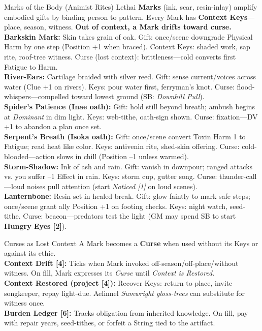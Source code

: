 \documentclass[11pt]{book}
\begin{document}
\begin{atTheTable}{Marks of the Body (Animist Rites)}
Lethai \textbf{Marks} (ink, scar, resin-inlay) amplify embodied gifts by binding person to pattern. Every Mark has \textbf{Context Keys}---place, season, witness. \textbf{Out of context, a Mark drifts toward curse.} \\
\textbf{Barkskin Mark:} Skin takes grain of oak. Gift: once/scene downgrade Physical Harm by one step (Position +1 when braced). Context Keys: shaded work, sap rite, roof-tree witness. Curse (lost context): brittleness---cold converts first Fatigue to Harm. \\
\textbf{River-Ears:} Cartilage braided with silver reed. Gift: sense current/voices across water (Clue +1 on rivers). Keys: pour water first, ferryman's knot. Curse: flood-whispers---compelled toward lowest ground (SB: \emph{Downhill Pull}). \\
\textbf{Spider's Patience (Inae oath):} Gift: hold still beyond breath; ambush begins at \emph{Dominant} in dim light. Keys: web-tithe, oath-sign shown. Curse: fixation---DV +1 to abandon a plan once set. \\
\textbf{Serpent's Breath (Isoka oath):} Gift: once/scene convert Toxin Harm 1 to Fatigue; read heat like color. Keys: antivenin rite, shed-skin offering. Curse: cold-blooded---action slows in chill (Position --1 unless warmed). \\
\textbf{Storm-Shadow:} Ink of ash and rain. Gift: vanish in downpour; ranged attacks vs. you suffer --1 Effect in rain. Keys: storm cup, gutter song. Curse: thunder-call---loud noises pull attention (start \emph{Noticed [1]} on loud scenes). \\
\textbf{Lanternbone:} Resin set in healed break. Gift: glow faintly to mark safe steps; once/scene grant ally Position +1 on footing checks. Keys: night watch, seed-tithe. Curse: beacon---predators test the light (GM may spend SB to start \textbf{Hungry Eyes [2]}).
\end{atTheTable}
\begin{atTheTable}{Curses as Lost Context}
A Mark becomes a \textbf{Curse} when used without its Keys or against its ethic. \\
\textbf{Context Drift [4]:} Ticks when Mark invoked off-season/off-place/without witness. On fill, Mark expresses its \textit{Curse} until \textit{Context is Restored}. \\
\textbf{Context Restored (project [4]):} Recover Keys: return to place, invite songkeeper, repay light-due. Aelinnel \textit{Sumwright gloss-trees} can substitute for witness once. \\
\textbf{Burden Ledger [6]:} Tracks obligation from inherited knowledge. On fill, pay with repair years, seed-tithes, or forfeit a String tied to the artifact.
\end{atTheTable}
\end{document}
